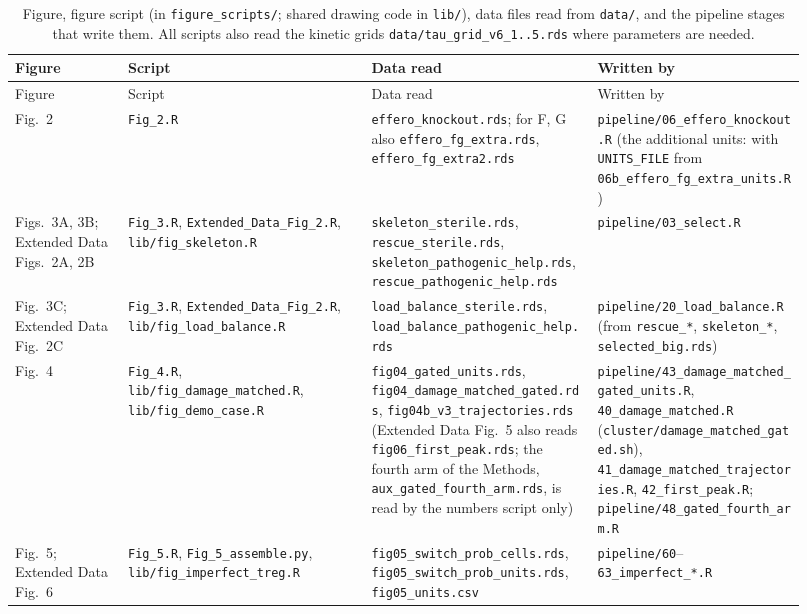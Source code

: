 \documentclass[11pt]{article}
\begin{document}
\begin{longtable}{@{}p{0.13\linewidth}p{0.29\linewidth}p{0.26\linewidth}p{0.24\linewidth}@{}}
\caption{Figure, figure script (in \texttt{figure\_scripts/}; shared drawing code in \texttt{lib/}),
data files read from \texttt{data/}, and the pipeline stages that write them. All
scripts also read the kinetic grids \texttt{data/tau\_grid\_v6\_1..5.rds} where
parameters are needed.}\label{tab:fig-script-data}\\
\toprule
Figure & Script & Data read & Written by\\\midrule
\endfirsthead
\toprule
Figure & Script & Data read & Written by\\\midrule
\endhead
\bottomrule
\endfoot
Fig.~2 & \texttt{Fig\_2.R} & \texttt{effero\_knockout.rds}; for F, G also \texttt{effero\_fg\_extra.rds}, \texttt{effero\_fg\_extra2.rds} & \texttt{pipeline/06\_effero\_knockout.R} (the additional units: with \texttt{UNITS\_FILE} from \texttt{06b\_effero\_fg\_extra\_units.R})\\
Figs.~3A, 3B; Extended Data Figs.~2A, 2B & \texttt{Fig\_3.R}, \texttt{Extended\_Data\_Fig\_2.R}, \texttt{lib/fig\_skeleton.R} & \texttt{skeleton\_sterile.rds}, \texttt{rescue\_sterile.rds}, \texttt{skeleton\_pathogenic\_help.rds}, \texttt{rescue\_pathogenic\_help.rds} & \texttt{pipeline/03\_select.R}\\
Fig.~3C; Extended Data Fig.~2C & \texttt{Fig\_3.R}, \texttt{Extended\_Data\_Fig\_2.R}, \texttt{lib/fig\_load\_balance.R} & \texttt{load\_balance\_sterile.rds}, \texttt{load\_balance\_pathogenic\_help.rds} & \texttt{pipeline/20\_load\_balance.R} (from \texttt{rescue\_*}, \texttt{skeleton\_*}, \texttt{selected\_big.rds})\\
Fig.~4 & \texttt{Fig\_4.R}, \texttt{lib/fig\_damage\_matched.R}, \texttt{lib/fig\_demo\_case.R} & \texttt{fig04\_gated\_units.rds}, \texttt{fig04\_damage\_matched\_gated.rds}, \texttt{fig04b\_v3\_trajectories.rds} (Extended Data Fig.~5 also reads \texttt{fig06\_first\_peak.rds}; the fourth arm of the Methods, \texttt{aux\_gated\_fourth\_arm.rds}, is read by the numbers script only) & \texttt{pipeline/43\_damage\_matched\_gated\_units.R}, \texttt{40\_damage\_matched.R} (\texttt{cluster/damage\_matched\_gated.sh}), \texttt{41\_damage\_matched\_trajectories.R}, \texttt{42\_first\_peak.R}; \texttt{pipeline/48\_gated\_fourth\_arm.R}\\
Fig.~5; Extended Data Fig.~6 & \texttt{Fig\_5.R}, \texttt{Fig\_5\_assemble.py}, \texttt{lib/fig\_imperfect\_treg.R} & \texttt{fig05\_switch\_prob\_cells.rds}, \texttt{fig05\_switch\_prob\_units.rds}, \texttt{fig05\_units.csv} & \texttt{pipeline/60}--\texttt{63\_imperfect\_*.R}\\

\end{longtable}
\end{document}
